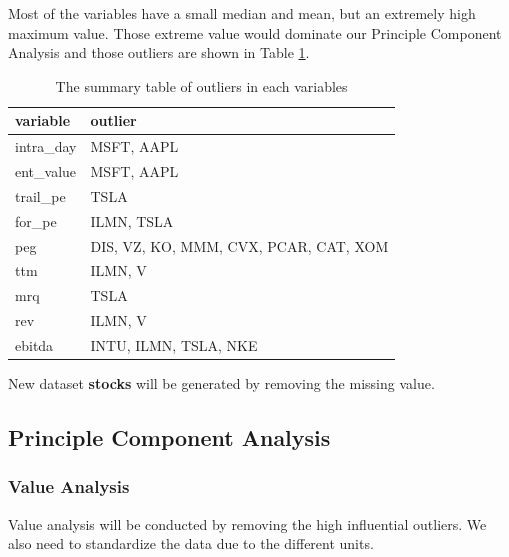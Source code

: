 \documentclass[11pt,a4paper,]{article}
\begin{document}
Most of the variables have a small median and mean, but an extremely high maximum value. Those extreme value would dominate our Principle Component Analysis and those outliers are shown in Table \ref{tab:outliers-table}.

\begin{table}

\caption{\label{tab:outliers-table}The summary table of outliers in each variables}
\centering
\begin{tabular}[t]{l|l}
\hline
variable & outlier\\
\hline
intra\_day & MSFT, AAPL\\
\hline
ent\_value & MSFT, AAPL\\
\hline
trail\_pe & TSLA\\
\hline
for\_pe & ILMN, TSLA\\
\hline
peg & DIS, VZ, KO, MMM, CVX, PCAR, CAT, XOM\\
\hline
ttm & ILMN, V\\
\hline
mrq & TSLA\\
\hline
rev & ILMN, V\\
\hline
ebitda & INTU, ILMN, TSLA, NKE\\
\hline
\end{tabular}
\end{table}

New dataset \textbf{stocks} will be generated by removing the missing value.

\hypertarget{principle-component-analysis}{%
\subsection{Principle Component Analysis}\label{principle-component-analysis}}

\hypertarget{value-analysis}{%
\subsubsection{Value Analysis}\label{value-analysis}}

Value analysis will be conducted by removing the high influential outliers. We also need to standardize the data due to the different units.
\end{document}
